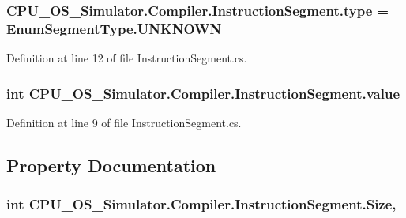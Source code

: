 \subsubsection[{type}]{ C\+P\+U\+\_\+\+O\+S\+\_\+\+Simulator.\+Compiler.\+Instruction\+Segment.\+type = {\bf Enum\+Segment\+Type.\+U\+N\+K\+N\+O\+W\+N}\hspace{0.3cm}{\ttfamily [private]}}\label{class_c_p_u___o_s___simulator_1_1_compiler_1_1_instruction_segment_aa6b21639fca4949423b6a4d0473450be}


Definition at line 12 of file Instruction\+Segment.\+cs.

\hypertarget{class_c_p_u___o_s___simulator_1_1_compiler_1_1_instruction_segment_acdf33d1614b2f7c9125f97793d0b6f8b}{}
\subsubsection[{value}]{\setlength{\rightskip}{0pt plus 5cm}int C\+P\+U\+\_\+\+O\+S\+\_\+\+Simulator.\+Compiler.\+Instruction\+Segment.\+value\hspace{0.3cm}{\ttfamily [private]}}\label{class_c_p_u___o_s___simulator_1_1_compiler_1_1_instruction_segment_acdf33d1614b2f7c9125f97793d0b6f8b}


Definition at line 9 of file Instruction\+Segment.\+cs.



\subsection{Property Documentation}
\hypertarget{class_c_p_u___o_s___simulator_1_1_compiler_1_1_instruction_segment_a6bdea24d923f03277868b53412a6a424}{}
\subsubsection[{Size}]{\setlength{\rightskip}{0pt plus 5cm}int C\+P\+U\+\_\+\+O\+S\+\_\+\+Simulator.\+Compiler.\+Instruction\+Segment.\+Size\hspace{0.3cm}{\ttfamily [get]}, {\ttfamily [set]}}\label{class_c_p_u___o_s___simulator_1_1_compiler_1_1_instruction_segment_a6bdea24d923f03277868b53412a6a424}


